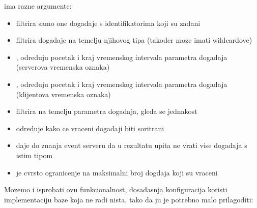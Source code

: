\documentclass[letterpaper,10pt,croatian]{sphinxmanual}
\begin{document}
\sphinxAtStartPar
{}
ima razne argumente:
\begin{itemize}
\item {} 
\sphinxAtStartPar
{} filtrira samo one dogadaje s identifikatorima koji su zadani

\item {} 
\sphinxAtStartPar
{} filtrira dogadaje na temelju njihovog tipa (takoder moze
imati wildcardove)

\item {} 
\sphinxAtStartPar
{},  odreduju pocetak i kraj vremenskog intervala
 parametra dogadaja (serverova vremenska oznaka)

\item {} 
\sphinxAtStartPar
{},  odreduju pocetak i kraj vremenskog
intervala  parametra dogadaja (klijentova vremenska
oznaka)

\item {} 
\sphinxAtStartPar
{} filtrira na temelju  parametra dogadaja, gleda se
jednakost

\item {} 
\sphinxAtStartPar
{} odreduje kako ce vraceni dogadaji biti soritrani

\item {} 
\sphinxAtStartPar
{} daje do znanja event serveru da u rezultatu upita ne vrati
vise dogadaja s istim tipom

\item {} 
\sphinxAtStartPar
{} je cvrsto ogranicenje na maksimalni broj dogdaja koji su
vraceni

\end{itemize}

\sphinxAtStartPar
Mozemo i isprobati ovu funkcionalnost, dosadasnja konfiguracija koristi
implementaciju baze koja ne radi nista, tako da ju je potrebno malo
prilagoditi:
\end{document}
